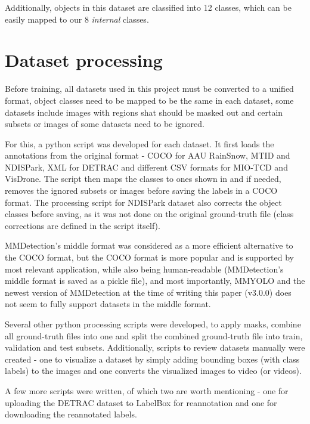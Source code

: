 Additionally, objects in this dataset are classified into 12 classes, which can
be easily mapped to our 8 \textit{internal} classes.


\section{Dataset processing}


Before training, all datasets used in this project must be converted to a
unified format, object classes need to be mapped to be the same in each dataset,
some datasets include images with regions shat should be masked out and certain
subsets or images of some datasets need to be ignored.

For this, a python script was developed for each dataset. It first loads the
annotations from the original format - COCO  for AAU RainSnow, MTID
and NDISPark, XML for DETRAC and different CSV formats for MIO-TCD and VisDrone.
The script then maps the classes to ones shown in  and if needed,
removes the ignored subsets or images before saving the labels in a COCO format.
The processing script for NDISPark dataset also corrects the object classes
before saving, as it was not done on the original ground-truth  file (class corrections are defined in the script itself).

MMDetection's middle format was considered as a more efficient alternative to
the COCO format, but the COCO format is more popular and is supported by most
relevant application, while also being human-readable (MMDetection's middle
format is saved as a pickle  file), and most importantly, MMYOLO
and the newest version of MMDetection at the time of writing this paper (v3.0.0)
does not seem to fully support datasets in the middle format.

Several other python processing scripts were developed, to apply masks, combine
all ground-truth files into one and split the combined ground-truth file into
train, validation and test subsets. Additionally, scripts to review datasets
manually were created - one to visualize a dataset by simply adding bounding
boxes (with class labels) to the images and one converts the visualized images
to video (or videos).

A few more scripts were written, of which two are worth mentioning - one for
uploading the DETRAC dataset to LabelBox for reannotation and one for
downloading the reannotated labels.



